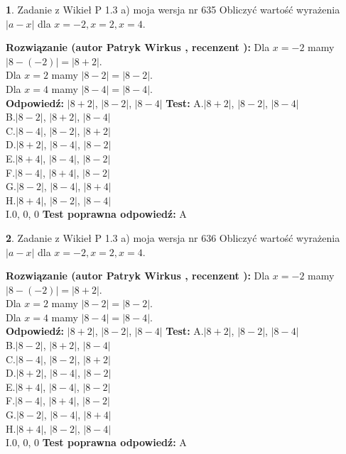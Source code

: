 \documentclass[12pt, a4paper]{article}
\theoremstyle{definition} %
\newtheorem{zad}{}
\newcommand{\zadStart}[1]{\begin{zad}#1\newline}
\newcommand{\zadStop}{\end{zad}}
\newcommand{\rozwStart}[2]{\noindent \textbf{Rozwiązanie (autor #1 , recenzent #2): }\newline}
\newcommand{\rozwStop}{\newline}
\newcommand{\odpStart}{\noindent \textbf{Odpowiedź:}\newline}
\newcommand{\odpStop}{\newline}
\newcommand{\testStart}{\noindent \textbf{Test:}\newline}
\newcommand{\testStop}{\newline}
\newcommand{\kluczStart}{\noindent \textbf{Test poprawna odpowiedź:}\newline}
\newcommand{\kluczStop}{\newline}
\begin{document}
\zadStart{Zadanie z Wikieł P 1.3 a) moja wersja nr 635}
Obliczyć wartość wyrażenia $|a - x|$ dla $x=-2,x=2,x=4$.
\zadStop
\rozwStart{Patryk Wirkus}{}
Dla $x = -2$ mamy $|8 - (-2)| = |8 + 2|$.\\
Dla $x = 2$ mamy $|8 - 2| = |8 - 2|$.\\
Dla $x = 4$ mamy $|8 - 4| = |8 - 4|$.\\
\rozwStop
\odpStart
$|8 + 2|$, $|8 - 2|$, $|8 - 4|$
\odpStop
\testStart
A.$|8 + 2|$, $|8 - 2|$, $|8 - 4|$\\
B.$|8 - 2|$, $|8 + 2|$, $|8 - 4|$\\
C.$|8 - 4|$, $|8 - 2|$, $|8 + 2|$\\
D.$|8 + 2|$, $|8 - 4|$, $|8 - 2|$\\
E.$|8 + 4|$, $|8 - 4|$, $|8 - 2|$\\
F.$|8 - 4|$, $|8 + 4|$, $|8 - 2|$\\
G.$|8 - 2|$, $|8 - 4|$, $|8 + 4|$\\
H.$|8 + 4|$, $|8 - 2|$, $|8 - 4|$\\
I.$0$, $0$, $0$
\testStop
\kluczStart
A
\kluczStop



\zadStart{Zadanie z Wikieł P 1.3 a) moja wersja nr 636}
Obliczyć wartość wyrażenia $|a - x|$ dla $x=-2,x=2,x=4$.
\zadStop
\rozwStart{Patryk Wirkus}{}
Dla $x = -2$ mamy $|8 - (-2)| = |8 + 2|$.\\
Dla $x = 2$ mamy $|8 - 2| = |8 - 2|$.\\
Dla $x = 4$ mamy $|8 - 4| = |8 - 4|$.\\
\rozwStop
\odpStart
$|8 + 2|$, $|8 - 2|$, $|8 - 4|$
\odpStop
\testStart
A.$|8 + 2|$, $|8 - 2|$, $|8 - 4|$\\
B.$|8 - 2|$, $|8 + 2|$, $|8 - 4|$\\
C.$|8 - 4|$, $|8 - 2|$, $|8 + 2|$\\
D.$|8 + 2|$, $|8 - 4|$, $|8 - 2|$\\
E.$|8 + 4|$, $|8 - 4|$, $|8 - 2|$\\
F.$|8 - 4|$, $|8 + 4|$, $|8 - 2|$\\
G.$|8 - 2|$, $|8 - 4|$, $|8 + 4|$\\
H.$|8 + 4|$, $|8 - 2|$, $|8 - 4|$\\
I.$0$, $0$, $0$
\testStop
\kluczStart
A
\kluczStop
\end{document}
